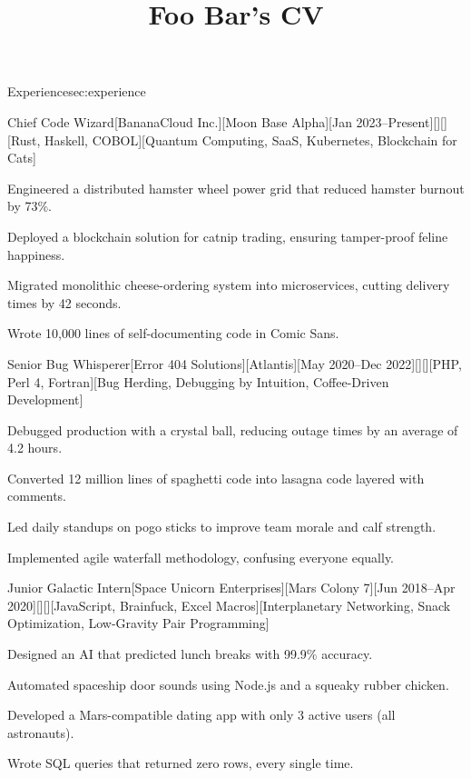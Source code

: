 \documentclass[10pt, letterpaper, extended ]{i-am-developer}
\title{Foo Bar's CV}
\begin{document}
\nameSection{\lipsum[1]}

\begin{devCVSection}{Experience}{sec:experience}
  \begin{devRole}{Chief Code Wizard}[BananaCloud Inc.][Moon Base
    Alpha][Jan 2023--Present][\faMagic][\faMapMarker][Rust, Haskell,
    COBOL][Quantum Computing, SaaS, Kubernetes, Blockchain for Cats]
    \begin{devItemize}
    \item Engineered a distributed hamster wheel power grid that
      reduced hamster burnout by 73\%.
    \item Deployed a blockchain solution for catnip trading, ensuring
      tamper-proof feline happiness.
    \item Migrated monolithic cheese-ordering system into
      microservices, cutting delivery times by 42 seconds.
    \item Wrote 10,000 lines of self-documenting code in Comic Sans.
    \end{devItemize}
  \end{devRole}

  \begin{devRole}{Senior Bug Whisperer}[Error 404
    Solutions][Atlantis][May 2020--Dec
    2022][\faBug][\faMapMarker][PHP, Perl 4, Fortran][Bug Herding,
    Debugging by Intuition, Coffee-Driven Development]
    \begin{devItemize}
    \item Debugged production with a crystal ball, reducing outage
      times by an average of 4.2 hours.
    \item Converted 12 million lines of spaghetti code into lasagna
      code layered with comments.
    \item Led daily standups on pogo sticks to improve team morale
      and calf strength.
    \item Implemented agile waterfall methodology, confusing everyone equally.
    \end{devItemize}
  \end{devRole}

  \begin{devRole}{Junior Galactic Intern}[Space Unicorn
    Enterprises][Mars Colony 7][Jun 2018--Apr
    2020][\faRocket][\faMapMarker][JavaScript, Brainfuck, Excel
    Macros][Interplanetary Networking, Snack Optimization,
    Low-Gravity Pair Programming]
    \begin{devItemize}
    \item Designed an AI that predicted lunch breaks with 99.9\% accuracy.
    \item Automated spaceship door sounds using Node.js and a squeaky
      rubber chicken.
    \item Developed a Mars-compatible dating app with only 3 active
      users (all astronauts).
    \item Wrote SQL queries that returned zero rows, every single time.
    \end{devItemize}
  \end{devRole}


\end{devCVSection}
\end{document}

